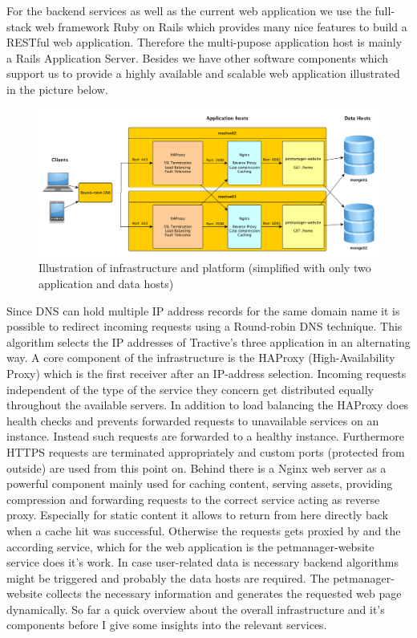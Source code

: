 For the backend services as well as the current web application we use the full-stack web framework Ruby on Rails which provides many nice features to build a RESTful web application. Therefore the multi-pupose application host is mainly a Rails Application Server. Besides we have other software components which support us to provide a highly available and scalable web application illustrated in the picture below. 

\begin{figure}[h]
	\centering
		\includegraphics[width=1.0\textwidth]{imgs/architecture.png}
	\caption{Illustration of infrastructure and platform (simplified with only two application and data hosts)}
\end{figure}

Since DNS can hold multiple IP address records for the same domain name it is possible to redirect incoming requests using a Round-robin DNS technique. This algorithm selects the IP addresses of Tractive's three application in an alternating way. A core component of the infrastructure is the HAProxy (High-Availability Proxy) which is the first receiver after an IP-address selection. Incoming requests independent of the type of the service they concern get distributed equally throughout the available servers. In addition to load balancing the HAProxy does health checks and prevents forwarded requests to unavailable services on an instance. Instead such requests are forwarded to a healthy instance. Furthermore HTTPS requests are terminated appropriately and custom ports (protected from outside) are used from this point on. Behind there is a Nginx web server as a powerful component mainly used for caching content, serving assets, providing compression and forwarding requests to the correct service acting as reverse proxy. Especially for static content it allows to return from here directly back when a cache hit was successful. Otherwise the requests gets proxied by and the according service, which for the web application is the petmanager-website service does it's work. In case user-related data is necessary backend algorithms might be triggered and probably the data hosts are required. The petmanager-website collects the necessary information and generates the requested web page dynamically. 
So far a quick overview about the overall infrastructure and it's components before I give some insights into the relevant services. 

